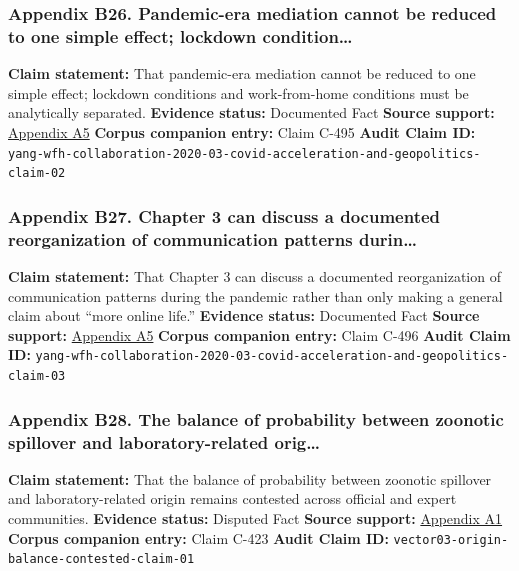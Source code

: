 \documentclass[
  american,
  11pt,
  letterpaper,
]{article}
\begin{document}
\subsubsection{Appendix B26. Pandemic-era mediation cannot be reduced to
one simple effect; lockdown
condition\ldots{}}\label{appendix-b26-pandemic-era-mediation-cannot-be-reduced-to-one-simple-effect-lockdown-condition}

\textbf{Claim statement:} That pandemic-era mediation cannot be reduced
to one simple effect; lockdown conditions and work-from-home conditions
must be analytically separated. \textbf{Evidence status:} Documented
Fact \textbf{Source support:}
\hyperref[appendix-a5-how-work-from-home-affects-collaboration-a-large-scale-study-of-information-workers-in-a-natural-experiment-during-covid-19]{Appendix
A5} \textbf{Corpus companion entry:} Claim C-495 \textbf{Audit Claim
ID:}
\texttt{yang-wfh-collaboration-2020-03-covid-acceleration-and-geopolitics-claim-02}

\subsubsection{Appendix B27. Chapter 3 can discuss a documented
reorganization of communication patterns
durin\ldots{}}\label{appendix-b27-chapter-3-can-discuss-a-documented-reorganization-of-communication-patterns-durin}

\textbf{Claim statement:} That Chapter 3 can discuss a documented
reorganization of communication patterns during the pandemic rather than
only making a general claim about ``more online life.'' \textbf{Evidence
status:} Documented Fact \textbf{Source support:}
\hyperref[appendix-a5-how-work-from-home-affects-collaboration-a-large-scale-study-of-information-workers-in-a-natural-experiment-during-covid-19]{Appendix
A5} \textbf{Corpus companion entry:} Claim C-496 \textbf{Audit Claim
ID:}
\texttt{yang-wfh-collaboration-2020-03-covid-acceleration-and-geopolitics-claim-03}

\subsubsection{Appendix B28. The balance of probability between zoonotic
spillover and laboratory-related
orig\ldots{}}\label{appendix-b28-the-balance-of-probability-between-zoonotic-spillover-and-laboratory-related-orig}

\textbf{Claim statement:} That the balance of probability between
zoonotic spillover and laboratory-related origin remains contested
across official and expert communities. \textbf{Evidence status:}
Disputed Fact \textbf{Source support:}
\hyperref[appendix-a1-report-on-potential-links-between-the-wuhan-institute-of-virology-and-the-origins-of-covid-19]{Appendix
A1} \textbf{Corpus companion entry:} Claim C-423 \textbf{Audit Claim
ID:} \texttt{vector03-origin-balance-contested-claim-01}
\end{document}
